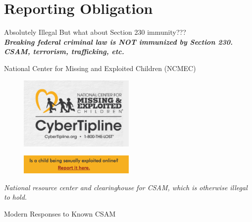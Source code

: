 \documentclass[nobackground,dvipsnames,table,aspectratio=169]{beamer}
\begin{document}
\section{Reporting Obligation}

\begin{frame}{Absolutely Illegal}
    \Large
    \centering
    But what about Section 230 immunity???\\
    \textbf{\textit{Breaking federal criminal law is NOT immunized by Section 230.}}\\
    \textbf{\textit{CSAM, terrorism, trafficking, etc.}}
\end{frame}

\begin{frame}{National Center for Missing and Exploited Children (NCMEC)}
    \centering
    \begin{figure}
        \centering
        \includegraphics[width=0.5\textwidth]{ncmec}
    \end{figure}
    \begin{figure}
        \centering
        \includegraphics[width=0.5\textwidth]{report-cse}
    \end{figure}
    \textit{National resource center and clearinghouse for CSAM, which is otherwise illegal to hold.}
\end{frame}

\begin{frame}{Modern Responses to Known CSAM}
    \centering
\end{frame}
\end{document}
